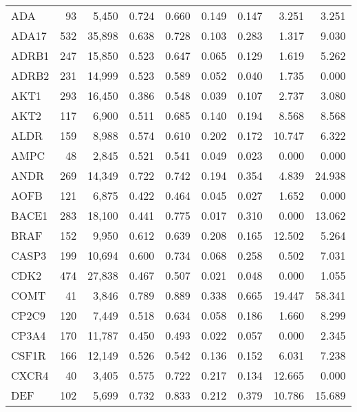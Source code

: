 \begin{center}
\begin{longtable}{lrrrrrrrr}
			ADA    & 93    & 5,450    & 0.724   & 0.660   & 0.149   & 0.147   & 3.251   & 3.251  \\
			ADA17  & 532   & 35,898   & 0.638   & 0.728   & 0.103   & 0.283   & 1.317   & 9.030  \\
			ADRB1  & 247   & 15,850   & 0.523   & 0.647   & 0.065   & 0.129   & 1.619   & 5.262  \\
			ADRB2  & 231   & 14,999   & 0.523   & 0.589   & 0.052   & 0.040   & 1.735   & 0.000  \\
			AKT1   & 293   & 16,450   & 0.386   & 0.548   & 0.039   & 0.107   & 2.737   & 3.080  \\
			AKT2   & 117   & 6,900    & 0.511   & 0.685   & 0.140   & 0.194   & 8.568   & 8.568  \\
			ALDR   & 159   & 8,988    & 0.574   & 0.610   & 0.202   & 0.172   & 10.747  & 6.322  \\
			AMPC   & 48    & 2,845    & 0.521   & 0.541   & 0.049   & 0.023   & 0.000   & 0.000  \\
			ANDR   & 269   & 14,349   & 0.722   & 0.742   & 0.194   & 0.354   & 4.839   & 24.938 \\
			AOFB   & 121   & 6,875    & 0.422   & 0.464   & 0.045   & 0.027   & 1.652   & 0.000  \\
			BACE1  & 283   & 18,100   & 0.441   & 0.775   & 0.017   & 0.310   & 0.000   & 13.062 \\
			BRAF   & 152   & 9,950    & 0.612   & 0.639   & 0.208   & 0.165   & 12.502  & 5.264  \\
			CASP3  & 199   & 10,694   & 0.600   & 0.734   & 0.068   & 0.258   & 0.502   & 7.031  \\
			CDK2   & 474   & 27,838   & 0.467   & 0.507   & 0.021   & 0.048   & 0.000   & 1.055  \\
			COMT   & 41    & 3,846    & 0.789   & 0.889   & 0.338   & 0.665   & 19.447  & 58.341 \\
			CP2C9  & 120   & 7,449    & 0.518   & 0.634   & 0.058   & 0.186   & 1.660   & 8.299  \\
			CP3A4  & 170   & 11,787   & 0.450   & 0.493   & 0.022   & 0.057   & 0.000   & 2.345  \\
			CSF1R  & 166   & 12,149   & 0.526   & 0.542   & 0.136   & 0.152   & 6.031   & 7.238  \\
			CXCR4  & 40    & 3,405    & 0.575   & 0.722   & 0.217   & 0.134   & 12.665  & 0.000  \\
			DEF    & 102   & 5,699    & 0.732   & 0.833   & 0.212   & 0.379   & 10.786  & 15.689 \\

\end{longtable}
\end{center}
